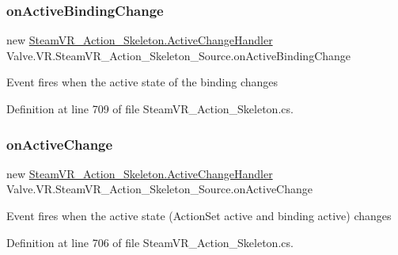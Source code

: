 \subsubsection{\texorpdfstring{onActiveBindingChange}{onActiveBindingChange}}
{\footnotesize\ttfamily new \mbox{\hyperlink{class_valve_1_1_v_r_1_1_steam_v_r___action___skeleton_ae329ff2582f41c7ec52ecdf3b34b345a}{Steam\+V\+R\+\_\+\+Action\+\_\+\+Skeleton.\+Active\+Change\+Handler}} Valve.\+V\+R.\+Steam\+V\+R\+\_\+\+Action\+\_\+\+Skeleton\+\_\+\+Source.\+on\+Active\+Binding\+Change}



Event fires when the active state of the binding changes 



Definition at line 709 of file Steam\+V\+R\+\_\+\+Action\+\_\+\+Skeleton.\+cs.

\mbox{\label{class_valve_1_1_v_r_1_1_steam_v_r___action___skeleton___source_ac3a839e79fa9302d13226bc7a3c90495}} 
\subsubsection{\texorpdfstring{onActiveChange}{onActiveChange}}
{\footnotesize\ttfamily new \mbox{\hyperlink{class_valve_1_1_v_r_1_1_steam_v_r___action___skeleton_ae329ff2582f41c7ec52ecdf3b34b345a}{Steam\+V\+R\+\_\+\+Action\+\_\+\+Skeleton.\+Active\+Change\+Handler}} Valve.\+V\+R.\+Steam\+V\+R\+\_\+\+Action\+\_\+\+Skeleton\+\_\+\+Source.\+on\+Active\+Change}



Event fires when the active state (Action\+Set active and binding active) changes 



Definition at line 706 of file Steam\+V\+R\+\_\+\+Action\+\_\+\+Skeleton.\+cs.

\mbox{\label{class_valve_1_1_v_r_1_1_steam_v_r___action___skeleton___source_aba69647625587197739051f0df32076e}} 
